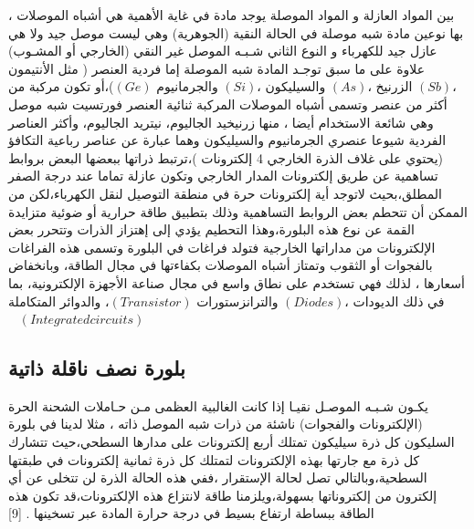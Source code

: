	
	بين المواد العازلة و المواد الموصلة يوجد مادة في غاية الأهمية هي أشباه الموصلات  ، بها نوعين مادة شبه موصلة في الحالة النقية (الجوهرية) وهي ليست موصل جيد ولا هي عازل جيد للكهرباء و النوع الثاني شـبـه الموصل غير النقي (الخارجي أو المشـوب) علاوة على ما سبق توجـد المادة شبه الموصلة إما فردية العنصر ( مثل  الأنتيمون $ ( Sb)، $ الزرنيخ $ ( As )، $ والسيليكون $ (Si)، $ والجرمانيوم  $ (G e) $)،أو تكون مركبة من أكثر من عنصر وتسمى أشباه الموصلات المركبة ثنائية العنصر فورتسیت شبه موصل وهي شائعة الاستخدام أيضا ، منها زرنيخيد الجاليوم، نيتريد الجاليوم، وأكثر العناصر الفردية شيوعا عنصري الجرمانيوم والسيليكون وهما عبارة عن عناصر رباعية التكافؤ (يحتوي على غلاف الذرة الخارجي 4 إلكترونات )‬،ترتبط ذراتها ببعضها البعض بروابط تساهمية عن طريق إلكترونات المدار الخارجي وتكون عازلة تماما عند درجة الصفر المطلق،بحيث لاتوجد أية إلكترونات حرة في منطقة التوصيل لنقل الكهرباء،‫لكن من الممكن أن تتحطم بعض الروابط التساهمية وذلك بتطبيق طاقة حرارية أو ضوئية متزايدة القمة عن نوع هذه البلورة،وهذا التحطيم يؤدي إلى إهتزاز الذرات وتتحرر بعض الإلكترونات من مداراتها الخارجية فتولد فراغات في البلورة وتسمى هذه الفراغات بالفجوات أو الثقوب  وتمتاز أشباه الموصلات بكفاءتها في مجال الطاقة، وبانخفاض أسعارها ، لذلك فهي تستخدم على نطاق واسع في مجال صناعة الأجهزة الإلكترونية، بما في ذلك الديودات  $ (Diodes)، $ والترانزستورات $ (Transistor )$، والدوائر المتكاملة 
	$(  Integrated circuits)   $
	\cite{a2} \cite{a6} \cite{a7}~\citep{a8}
	   
	
	\subsection{ بلورة نصف ناقلة ذاتية}
	يكـون شـبـه الموصـل نقيـا إذا كانت الغالبية العظمى مـن حـاملات الشحنة الحرة (الإلكترونات والفجوات) ناشئة من ذرات شبه الموصل ذاته ، مثلا لدينا في بلورة السليكون كل ذرة سيليكون تمتلك أربع إلكترونات على مدارها السطحي،حيث تتشارك كل ذرة مع جارتها بهذه الإلكترونات لتمتلك كل ذرة ثمانية إلكترونات في طبقتها السطحية،وبالتالي تصل لحالة الإستقرار ،ففي هذه الحالة الذرة لن تتخلى عن أي إلكترون من إلكتروناتها بسهولة،ويلزمنا طاقة لانتزاع هذه الإلكترونات،قد تكون هذه الطاقة ببساطة ارتفاع بسيط في درجة حرارة المادة عبر تسخينها  .   \cite{a7}     
	 [9]
	
